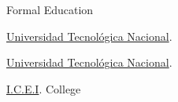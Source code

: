\begin{rubric}{Formal Education}

 \href{http://www.utn.edu.ar}{Universidad Tecnológica Nacional}. 

 \href{http://www.utn.edu.ar}{Universidad Tecnológica Nacional}.

 \href{http://www.colegioicei.com.ar}{I.C.E.I}. College

\end{rubric}
